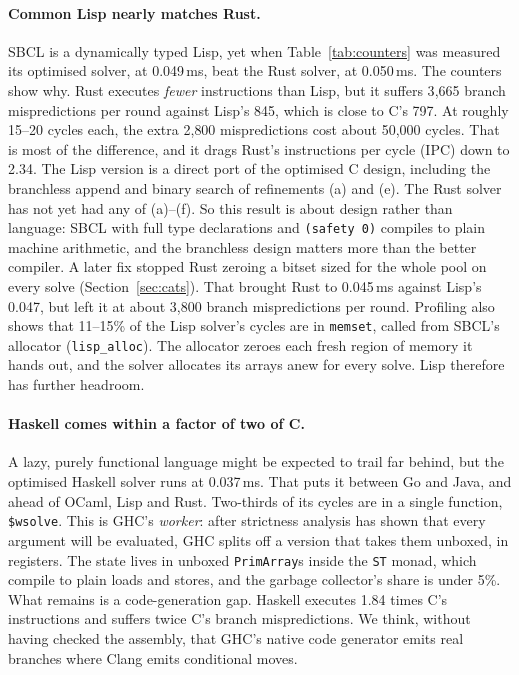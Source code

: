 \documentclass[11pt,a4paper]{article}
\theoremstyle{definition}
\theoremstyle{remark}
\begin{document}
\paragraph{Common Lisp nearly matches Rust.}
SBCL is a dynamically typed Lisp, yet when Table~\ref{tab:counters} was measured its optimised solver, at 0.049\,ms, beat the Rust solver, at 0.050\,ms. The
counters show why. Rust executes \emph{fewer} instructions than Lisp, but it suffers 3{,}665 branch
mispredictions per round against Lisp's 845, which is close to C's 797. At roughly 15--20 cycles each, the
extra 2{,}800 mispredictions cost about 50{,}000 cycles. That is most of the difference, and it drags Rust's
instructions per cycle (IPC) down to 2.34. The Lisp version is a direct port of the optimised C design, including the
branchless append and binary search of refinements (a) and (e). The Rust solver has not yet had any of
(a)--(f). So this result is about design rather than language: SBCL with full type declarations and
\texttt{(safety 0)} compiles to plain machine arithmetic, and the branchless design matters more than the
better compiler. A later fix stopped Rust zeroing a bitset sized for the whole pool on every solve (Section~\ref{sec:cats}). That brought Rust to 0.045\,ms against Lisp's 0.047, but left it at about 3{,}800 branch mispredictions per round. Profiling also shows that 11--15\% of the Lisp solver's cycles are in \texttt{memset}, called from
SBCL's allocator (\texttt{lisp\_alloc}). The allocator zeroes each fresh region of memory it hands out,
and the solver allocates its arrays anew for every solve. Lisp therefore has further headroom.

\paragraph{Haskell comes within a factor of two of C.}
A lazy, purely functional language might be expected to trail far behind, but the optimised Haskell solver
runs at 0.037\,ms. That puts it between Go and Java, and ahead of OCaml, Lisp and Rust. Two-thirds of its cycles
are in a single function, \texttt{\$wsolve}. This is GHC's \emph{worker}: after strictness analysis
has shown that every argument will be evaluated, GHC splits off a version that takes them unboxed, in
registers. The state lives in unboxed \texttt{PrimArray}s inside the \texttt{ST} monad, which compile to
plain loads and stores, and the garbage collector's share is under 5\%. What remains is a code-generation
gap. Haskell executes 1.84 times C's instructions and suffers twice C's branch mispredictions. We think,
without having checked the assembly, that GHC's native code generator emits real branches where Clang
emits conditional moves.
\end{document}

